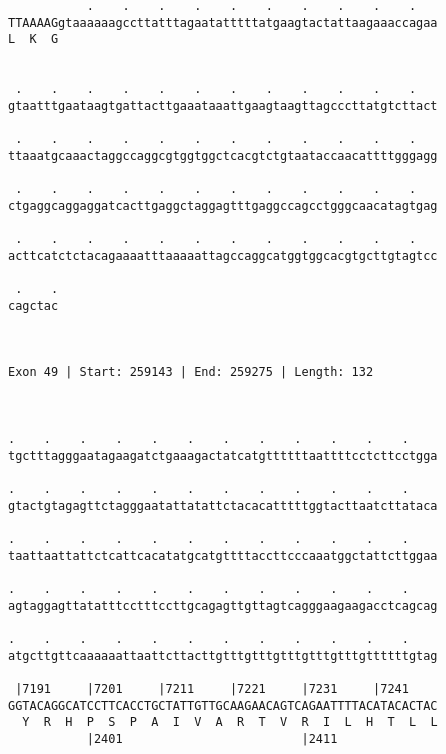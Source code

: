 \documentclass{article}
\begin{document}
\begin{Verbatim}
           .    .    .    .    .    .    .    .    .    .   
TTAAAAGgtaaaaaagccttatttagaatatttttatgaagtactattaagaaaccagaa
L  K  G                                                     
                                                            
  
 .    .    .    .    .    .    .    .    .    .    .    .   
gtaatttgaataagtgattacttgaaataaattgaagtaagttagcccttatgtcttact
                                                            
 .    .    .    .    .    .    .    .    .    .    .    .   
ttaaatgcaaactaggccaggcgtggtggctcacgtctgtaataccaacattttgggagg
                                                            
 .    .    .    .    .    .    .    .    .    .    .    .   
ctgaggcaggaggatcacttgaggctaggagtttgaggccagcctgggcaacatagtgag
                                                            
 .    .    .    .    .    .    .    .    .    .    .    .   
acttcatctctacagaaaatttaaaaattagccaggcatggtggcacgtgcttgtagtcc
                                                            
 .    .
cagctac
       
       
 
Exon 49 | Start: 259143 | End: 259275 | Length: 132



.    .    .    .    .    .    .    .    .    .    .    .    
tgctttagggaatagaagatctgaaagactatcatgttttttaattttcctcttcctgga
                                                            
.    .    .    .    .    .    .    .    .    .    .    .    
gtactgtagagttctagggaatattatattctacacatttttggtacttaatcttataca
                                                            
.    .    .    .    .    .    .    .    .    .    .    .    
taattaattattctcattcacatatgcatgttttaccttcccaaatggctattcttggaa
                                                            
.    .    .    .    .    .    .    .    .    .    .    .    
agtaggagttatatttcctttccttgcagagttgttagtcagggaagaagacctcagcag
                                                            
.    .    .    .    .    .    .    .    .    .    .    .    
atgcttgttcaaaaaattaattcttacttgtttgtttgtttgtttgtttgttttttgtag
                                                            
 |7191     |7201     |7211     |7221     |7231     |7241    
GGTACAGGCATCCTTCACCTGCTATTGTTGCAAGAACAGTCAGAATTTTACATACACTAC
  Y  R  H  P  S  P  A  I  V  A  R  T  V  R  I  L  H  T  L  L
           |2401                         |2411              
  

\end{Verbatim}
\end{document}
